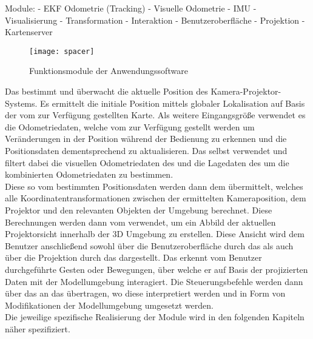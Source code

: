 Module: \mLocalization - EKF Odometrie (Tracking) - Visuelle Odometrie - IMU - Visualisierung - Transformation - Interaktion - Benutzeroberfläche - Projektion - Kartenserver

\begin{figure}[ht]
	\begin{center}
		\texttt{[image: spacer]}
		\caption{Funktionsmodule der Anwendungssoftware}
		\label{fig.modules}
	\end{center}
\end{figure}

Das \mLocalization bestimmt und überwacht die aktuelle Position des Kamera-Projektor-Systems. Es ermittelt die initiale Position mittels globaler Lokalisation auf Basis der vom \mMapserver zur Verfügung gestellten Karte. Als weitere Eingangsgröße verwendet es die Odometriedaten, welche vom \mEkf zur Verfügung gestellt werden um Veränderungen in der Position während der Bedienung zu erkennen und die Positionsdaten dementsprechend zu aktualisieren. Das \mEkf selbst verwendet und filtert dabei die visuellen Odometriedaten des \mFovis und die Lagedaten des \mImu {} um die kombinierten Odometriedaten zu bestimmen.\\
Diese so vom \mLocalization bestimmten Positionsdaten werden dann dem \mTransformation übermittelt, welches alle Koordinatentransformationen zwischen der ermittelten Kameraposition, dem Projektor und den relevanten Objekten der Umgebung berechnet. Diese Berechnungen werden dann vom \mVisualization verwendet, um ein Abbild der aktuellen Projektorsicht innerhalb der 3D Umgebung zu erstellen. Diese Ansicht wird dem Benutzer anschließend sowohl über die Benutzeroberfläche durch das \mGui als auch über die Projektion durch das \mProjection dargestellt. Das \mInteraction erkennt vom Benutzer durchgeführte Gesten oder Bewegungen, über welche er auf Basis der projizierten Daten mit der Modellumgebung interagiert. Die Steuerungsbefehle werden dann über das \mTransformation an das \mVisualization übertragen, wo diese interpretiert werden und in Form von Modifikationen der Modellumgebung umgesetzt werden.\\
Die jeweilige spezifische Realisierung der Module wird in den folgenden Kapiteln näher spezifiziert.\\

